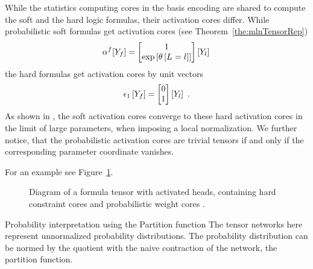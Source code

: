 While the statistics computing cores in the basis encoding are shared to compute the soft and the hard logic formulas, their activation cores differ.
While probabilistic soft formulas get activation cores (see Theorem~\ref{the:mlnTensorRep})
\begin{align*}
	\alpha^{f}[Y_{f}] 
	= \begin{bmatrix} 1 \\
		 \mathrm{exp}\left[\theta\left[L_{}=l_{}\right]\right] 
		 \end{bmatrix}[Y_{l}] \,
\end{align*}
the hard formulas get activation cores by unit vectors
\begin{align*}
	\tbasisat{\formulavar} 
	= \begin{bmatrix} 0 \\
		 1
	 \end{bmatrix}[\enumformulavar]  \, .
\end{align*}
As shown in , the soft activation cores converge to these hard activation cores in the limit of large parameters, when imposing a local normalization.
%
We further notice, that the probabilistic activation cores are trivial tensors if and only if the corresponding parameter coordinate vanishes.


For an example see Figure~\ref{fig:ActivatedHeads}.

\begin{figure}[h]
\begin{center}
	
\end{center}
\caption{Diagram of a formula tensor with activated heads, containing \textcolor{\concolor}{hard constraint cores} and \textcolor{\probcolor}{probabilistic weight cores} .} %
\label{fig:ActivatedHeads} 
\end{figure}



\begin{remark}{Probability interpretation using the Partition function}
	The tensor networks here represent unnormalized probability distributions.
	The probability distribution can be normed by the quotient with the naive contraction of the network, the partition function.
\end{remark}


